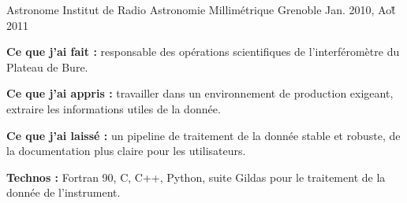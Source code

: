 \begin{cventries}
  \cventry
    {Astronome} %
    {Institut de Radio Astronomie Millimétrique} %
    {Grenoble} %
    {Jan. 2010, Ao\^\u t 2011} %
    {
      \begin{cvitems} %
        \item {\textbf{Ce que j'ai fait :} responsable des opérations scientifiques de l'interféromètre du Plateau de Bure.}
        \item {\textbf{Ce que j'ai appris :} travailler dans un environnement de production exigeant, extraire les informations utiles de la donnée.}
        \item {\textbf{Ce que j'ai laissé :} un pipeline de traitement de la donnée stable et robuste, de la documentation plus claire pour les utilisateurs.}
        \item {\textbf{Technos :} Fortran 90, C, C++, Python, suite Gildas pour le traitement de la donnée de l'instrument.}
      \end{cvitems}
    }

\end{cventries}
